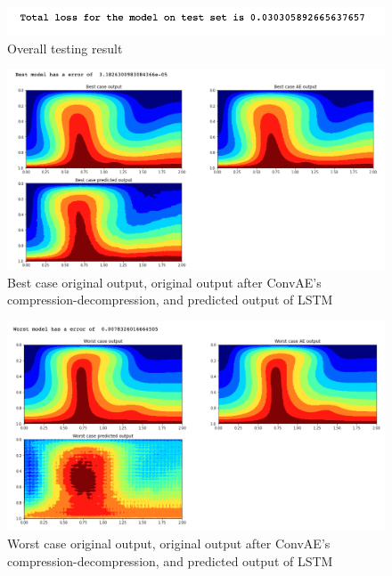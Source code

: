 \begin{figure}[H]
    \caption{Overall testing result}
    \includegraphics[scale=0.8]{Report LaTeX/figures/mantle_convection_images/larger_dataset/LSTM_OverallTesting.png}
\end{figure}

\begin{figure}[H]
    \caption{Best case original output, original output after ConvAE's compression-decompression, and predicted output of LSTM}
    \includegraphics[scale=0.5]{Report LaTeX/figures/mantle_convection_images/larger_dataset/LSTM_Best.png}
\end{figure}

\begin{figure}[H]
    \caption{Worst case original output, original output after ConvAE's compression-decompression, and predicted output of LSTM}
    \includegraphics[scale=0.5]{Report LaTeX/figures/mantle_convection_images/larger_dataset/LSTM_Worst.png}
\end{figure}



